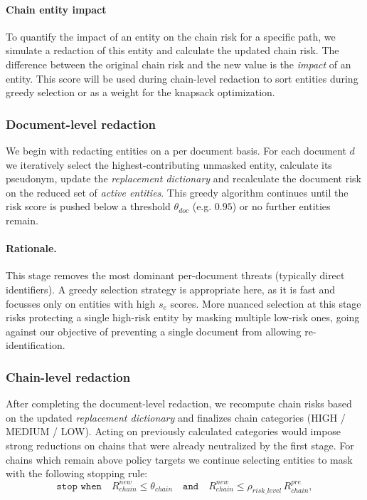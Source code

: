 \paragraph{Chain entity impact}
To quantify the impact of an entity on the chain risk for a specific path, we simulate a redaction of this entity and calculate the updated chain risk. The difference between the original chain risk and the new value is the \textit{impact} of an entity. This score will be used during chain-level redaction to sort entities during greedy selection or as a weight for the knapsack optimization.


\subsubsection{Document-level redaction}
We begin with redacting entities on a per document basis. For each document $d$ we iteratively select the highest-contributing unmasked entity, calculate its pseudonym, update the \textit{replacement dictionary} and recalculate the document risk on the reduced set of \textit{active entities}. This greedy algorithm continues until the risk score is pushed below a threshold $\theta_{doc}$ (e.g. $0.95$) or no further entities remain.
\paragraph{Rationale.} This stage removes the most dominant per-document threats (typically direct identifiers). A greedy selection strategy is appropriate here, as it is fast and focusses only on entities with high $s_e$ scores. More nuanced selection at this stage risks protecting a single high-risk entity by masking multiple low-risk ones, going against our objective of preventing a single document from allowing re-identification.

\subsubsection{Chain-level redaction}
After completing the document-level redaction, we recompute chain risks based on the updated \textit{replacement dictionary} and finalizes chain categories (HIGH / MEDIUM / LOW). Acting on previously calculated categories would impose strong reductions on chains that were already neutralized by the first stage. For chains which remain above policy targets we continue selecting entities to mask with the following stopping rule: 
\[
\texttt{stop when}\quad R_{chain}^{new} \le \theta_{chain} \quad \texttt{and} \quad R_{chain}^{new} \le \rho_{risk\_level}\,R_{chain}^{pre},
\]

